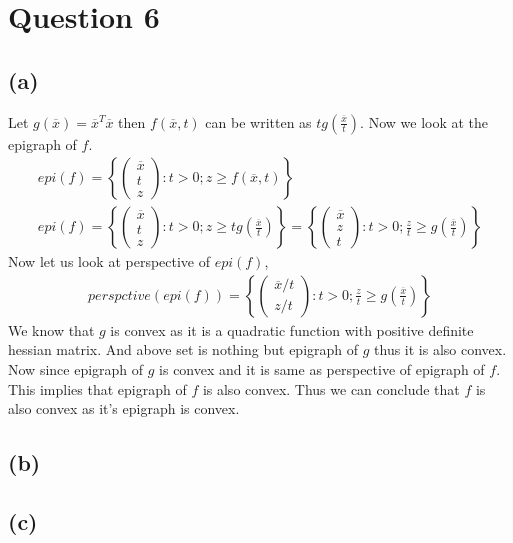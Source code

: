 \documentclass{article}
\begin{document}
\section*{\hfil Question 6}
\subsection*{(a)}
Let $g(\overline{x}) = \overline{x}^T\overline{x}$ then $f(\overline{x}, t)$ can be written as $tg(\frac{\overline{x}}{t})$. Now we look at the epigraph of $f$.
\begin{gather*}
	epi(f) = \left\{\begin{pmatrix}
	\overline{x}\\
	t\\
	z
	\end{pmatrix} : t > 0; z \ge f(\overline{x}, t)\right\}\\
	epi(f) = \left\{\begin{pmatrix}
	\overline{x}\\
	t\\
	z
	\end{pmatrix} : t > 0; z \ge tg\left(\frac{\overline{x}}{t}\right)\right\} = \left\{\begin{pmatrix}
	\overline{x}\\
	z\\
	t
	\end{pmatrix} : t > 0; \frac{z}{t} \ge g\left(\frac{\overline{x}}{t}\right)\right\}
\end{gather*}
Now let us look at perspective of $epi(f)$,
\begin{gather*}
perspctive(epi(f)) = \left\{\begin{pmatrix}
	\overline{x}/t\\
	z/t
	\end{pmatrix} : t > 0; \frac{z}{t} \ge g\left(\frac{\overline{x}}{t}\right)\right\}
\end{gather*}
We know that $g$ is convex as it is a quadratic function with positive definite hessian matrix. And above set is nothing but epigraph of $g$ thus it is also convex. Now since epigraph of $g$ is convex and it is same as perspective of epigraph of $f$. This implies that epigraph of $f$ is also convex. Thus we can conclude that $f$ is also convex as it's epigraph is convex.
\subsection*{(b)}
\subsection*{(c)}
\end{document}

